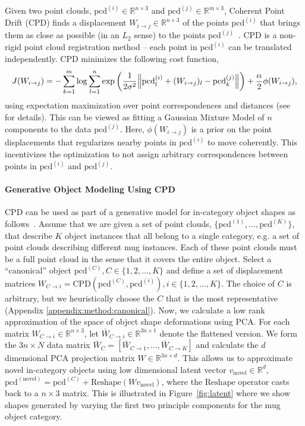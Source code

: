 \documentclass{article}
\newcommand{\pcx}[1]{\mathrm{pcd}^{(#1)}}
\newcommand{\wxy}[2]{W_{#1 \rightarrow #2}}
\newcommand{\bwxy}[2]{\bar{W}_{#1 \rightarrow #2}}
\newcommand{\pci}{\pcx{i}}
\newcommand{\pcj}{\pcx{j}}
\newcommand{\pcc}{\pcx{C}}
\newcommand{\wij}{\wxy{i}{j}}
\begin{document}
Given two point clouds, $\pci \in \mathbb{R}^{n \times 3}$ and $\pcj \in \mathbb{R}^{m \times 3}$, Coherent Point Drift (CPD) finds a displacement $\wij  \in \mathbb{R}^{n \times 3}$ of the points $\pci$ that brings them as close as possible (in an $L_2$ sense) to the points $\pcj$~\cite{myronenko2010point}. CPD is a non-rigid point cloud registration method -- each point in $\pci$ can be translated independently. CPD minimizes the following cost function,
\begin{align}
    J(\wij) = - \sum_{k=1}^{m} \log \sum_{l=1}^{n} \exp \left( \frac{1}{2 \sigma^2} \norm{\pci_l + (W_{i \rightarrow j})_l - \pcj_k } \right) + \frac{\alpha}{2} \phi(\wij),
\end{align}
using expectation maximization over point correspondences and distances (see~\cite{myronenko2010point} for details). This can be viewed as fitting a Gaussian Mixture Model of $n$ components to the data $\pcj$. Here, $\phi(\wij)$ is a prior on the point displacements that regularizes nearby points in $\pci$ to move coherently. This incentivizes the optimization to not assign arbitrary correspondences between points in $\pci$ and $\pcj$.

\paragraph{Generative Object Modeling Using CPD}

CPD can be used as part of a generative model for in-category object shapes as follows~\cite{rodriguez18transferring}. Assume that we are given a set of point clouds, $\{\pcx{1}, \dots, \pcx{K}\}$, that describe $K$ object instances that all belong to a single category, e.g. a set of point clouds describing different mug instances. Each of these point clouds must be a full point cloud in the sense that it covers the entire object. Select a ``canonical'' object $\pcx{C}, C \in \{1,2, ..., K\}$ and define a set of displacement matrices $\wxy{C}{i} = \mathrm{CPD}(\pcx{C}, \pcx{i}), i \in \{1, 2, ..., K\}$. The choice of $C$ is arbitrary, but we heuristically choose the $C$ that is the most representative (Appendix \ref{appendix:method:canonical}). Now, we calculate a low rank approximation of the space of object shape deformations using PCA. For each matrix $\wxy{C}{i} \in \mathbb{R}^{n \times 3}$, let $\bwxy{C}{i} \in \mathbb{R}^{3n \times 1}$ denote the flattened version. We form the $3n \times N$ data matrix $\bar{W}_C = \left[\bwxy{C}{1}, \dots, \bwxy{C}{K}\right]$ and calculate the $d$ dimensional PCA projection matrix $W \in \mathbb{R}^{3n \times d}$. This allows us to approximate novel in-category objects using low dimensional latent vector $v_{\mathrm{novel}} \in \mathbb{R}^d$, $\pcx{\mathrm{novel}} = \pcc + \mathrm{Reshape}(W v_{\mathrm{novel}})$, where the $\mathrm{Reshape}$ operator casts back to a $n \times 3$ matrix. This is illustrated in Figure~\ref{fig:latent} where we show shapes generated by varying the first two principle components for the mug object category.
\end{document}
